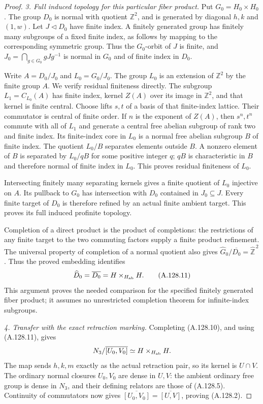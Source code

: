 \begin{proof}
\emph{3. Full induced topology for this particular fiber product.}
Put \(G_0=H_0\times H_0\). The group \(D_0\) is normal
with quotient \(\mathbb Z^2\), and is generated by diagonal
\(h,k\) and \((1,w)\). Let \(J\triangleleft D_0\) have
finite index. A finitely generated group has finitely many
subgroups of a fixed finite index, as follows by mapping to
the corresponding symmetric group. Thus the \(G_0\)-orbit
of \(J\) is finite, and
\(J_0=\bigcap_{g\in G_0}gJg^{-1}\) is normal in \(G_0\)
and of finite index in \(D_0\).

Write \(A=D_0/J_0\) and \(L_0=G_0/J_0\). The group
\(L_0\) is an extension of \(\mathbb Z^2\) by the finite
group \(A\). We verify residual finiteness directly.
The subgroup \(L_1=C_{L_0}(A)\) has finite index, kernel
\(Z(A)\) over its image in \(\mathbb Z^2\), and that
kernel is finite central. Choose lifts \(s,t\) of a basis
of that finite-index lattice. Their commutator is central
of finite order. If \(n\) is the exponent of \(Z(A)\),
then \(s^n,t^n\) commute with all of \(L_1\) and generate
a central free abelian subgroup of rank two and finite
index. Its finite-index core in \(L_0\) is a normal free
abelian subgroup \(B\) of finite index. The quotient
\(L_0/B\) separates elements outside \(B\). A nonzero
element of \(B\) is separated by \(L_0/qB\) for some
positive integer \(q\); \(qB\) is characteristic in \(B\)
and therefore normal of finite index in \(L_0\).
This proves residual finiteness of \(L_0\).

Intersecting finitely many separating kernels gives a finite
quotient of \(L_0\) injective on \(A\). Its pullback to
\(G_0\) has intersection with \(D_0\) contained in
\(J_0\subseteq J\). Every finite target of \(D_0\) is
therefore refined by an actual finite ambient target. This
proves its full induced profinite topology.

Completion of a direct product is the product of completions:
the restrictions of any finite target to the two commuting
factors supply a finite product refinement. The universal
property of completion of a normal quotient also gives
\(\widehat G_0/\overline{D_0}=\widehat{\mathbb Z}^{\,2}\).
Thus the proved embedding identifies
\[
 \widehat D_0=\overline{D_0}
           =H\times_{H_{\rm ab}}H.                        \tag{A.128.11}
\]
This argument proves the needed comparison for the specified
finitely generated fiber product; it assumes no unrestricted
completion theorem for infinite-index subgroups.

\emph{4. Transfer with the exact retraction marking.}
Completing (A.128.10), and using (A.128.11), gives
\[
 N_3/\overline{[U_0,V_0]}\simeq H\times_{H_{\rm ab}}H.
\]
The map sends \(h,k,m\) exactly as the actual retraction
pair, so its kernel is \(U\cap V\). The ordinary normal
closures \(U_0,V_0\) are dense in \(U,V\): the ambient
ordinary free group is dense in \(N_3\), and their defining
relators are those of (A.128.5). Continuity of commutators
now gives
\(\overline{[U_0,V_0]}=\overline{[U,V]}\), proving
(A.128.2).


\end{proof}
